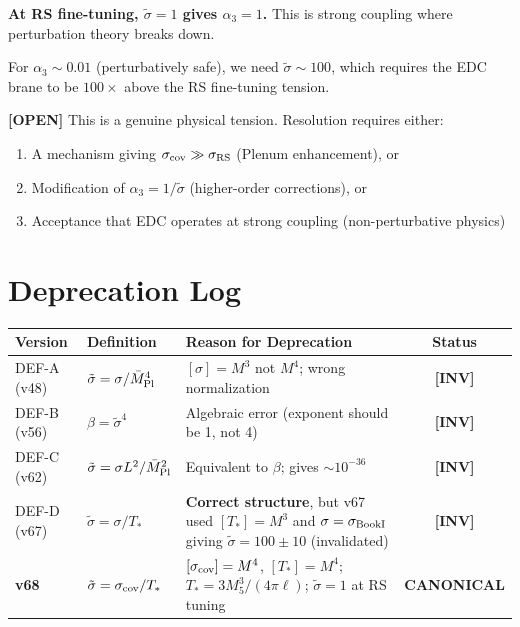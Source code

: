 \documentclass[11pt,a4paper]{article}
\newcommand{\tagOPEN}{\textcolor{openred}{\textbf{[OPEN]}}}
\newcommand{\tagINV}{\textcolor{invalidgray}{\textbf{[INV]}}}
\theoremstyle{definition}
\theoremstyle{remark}
\begin{document}
\textbf{At RS fine-tuning, $\tilde\sigma = 1$ gives $\alpha_3 = 1$.}
This is strong coupling where perturbation theory breaks down.

For $\alpha_3 \sim 0.01$ (perturbatively safe), we need
$\tilde\sigma \sim 100$, which requires the EDC brane to be
$100\times$ above the RS fine-tuning tension.

\tagOPEN{} This is a genuine physical tension. Resolution requires either:
\begin{enumerate}[label=(\alph*)]
\item A mechanism giving $\sigma_{\rm cov} \gg \sigma_{\rm RS}$
  (Plenum enhancement), or
\item Modification of $\alpha_3 = 1/\tilde\sigma$
  (higher-order corrections), or
\item Acceptance that EDC operates at strong coupling
  (non-perturbative physics)
\end{enumerate}

\section{Deprecation Log}
\label{sec:deprecation}

\begin{center}
\renewcommand{\arraystretch}{1.3}
\begin{tabular}{lp{3.5cm}p{5cm}c}
\toprule
\textbf{Version} & \textbf{Definition} & \textbf{Reason for Deprecation} & \textbf{Status} \\
\midrule
DEF-A (v48) & $\tilde\sigma = \sigma/\bar{M}_{\rm Pl}^4$
  & $[\sigma] = M^3$ not $M^4$; wrong normalization & \tagINV \\
DEF-B (v56) & $\beta = \tilde\sigma^4$
  & Algebraic error (exponent should be 1, not 4) & \tagINV \\
DEF-C (v62) & $\tilde\sigma = \sigma L^2/\bar{M}_{\rm Pl}^2$
  & Equivalent to $\beta$; gives $\sim 10^{-36}$ & \tagINV \\
DEF-D (v67) & $\tilde\sigma = \sigma/T_*$
  & \textbf{Correct structure}, but v67 used $[T_*] = M^3$
    and $\sigma = \sigma_{\rm BookI}$ giving
    $\tilde\sigma = 100 \pm 10$ (invalidated) & \tagINV \\
\midrule
\textbf{v68} & $\tilde\sigma = \sigma_{\rm cov}/T_*$
  & $[\sigma_{\rm cov}] = M^4$, $[T_*] = M^4$;
    $T_* = 3M_5^3/(4\pi\ell)$; $\tilde\sigma = 1$ at RS tuning
  & \textbf{CANONICAL} \\
\bottomrule
\end{tabular}
\end{center}
\end{document}
